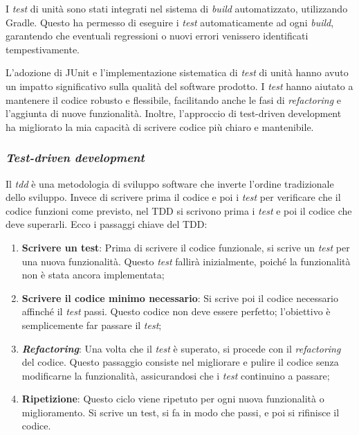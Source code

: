 I \textit{test} di unità sono stati integrati nel sistema di \textit{build} automatizzato, utilizzando Gradle. 
Questo ha permesso di eseguire i \textit{test} automaticamente ad ogni \textit{build}, 
garantendo che eventuali regressioni o nuovi errori venissero identificati tempestivamente.

L'adozione di JUnit e l'implementazione sistematica di \textit{test} di unità hanno avuto un impatto significativo sulla qualità del software prodotto. 
I \textit{test} hanno aiutato a mantenere il codice robusto e flessibile, facilitando anche le fasi di \textit{refactoring} e l'aggiunta di nuove funzionalità. 
Inoltre, l'approccio di test-driven development ha migliorato la mia capacità di scrivere codice più chiaro e mantenibile.

\subsubsection{\textit{Test-driven development}}
Il \textit{\gls{tdd}} è una metodologia di sviluppo software che inverte l'ordine tradizionale dello sviluppo. 
Invece di scrivere prima il codice e poi i \textit{test} per verificare che il codice funzioni come previsto, nel TDD si scrivono prima 
i \textit{test} e poi il codice che deve superarli. Ecco i passaggi chiave del TDD:
\begin{enumerate}
  \item \textbf{Scrivere un test}: Prima di scrivere il codice funzionale, si scrive un \textit{test} per una nuova funzionalità. Questo \textit{test} fallirà inizialmente, poiché la funzionalità non è stata ancora implementata;
  \item \textbf{Scrivere il codice minimo necessario}: Si scrive poi il codice necessario affinché il \textit{test} passi. Questo codice non deve essere perfetto; l'obiettivo è semplicemente far passare il \textit{test};
  \item \textit{\textbf{Refactoring}}: Una volta che il \textit{test} è superato, si procede con il \textit{refactoring} del codice. Questo passaggio consiste nel migliorare e pulire il codice senza modificarne la funzionalità, assicurandosi che i \textit{test} continuino a passare;
  \item \textbf{Ripetizione}: Questo ciclo viene ripetuto per ogni nuova funzionalità o miglioramento. Si scrive un test, si fa in modo che passi, e poi si rifinisce il codice.
\end{enumerate}

